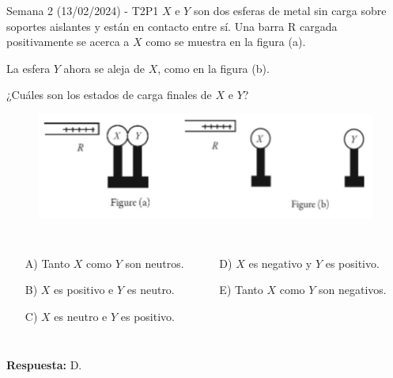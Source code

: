\begin{frame}{Semana 2 (13/02/2024) - T2P1}
        $X$ e $Y$ son dos esferas de metal sin carga sobre soportes aislantes y están en contacto entre sí. Una barra R cargada positivamente se acerca a $X$ como se muestra en la figura (a).
        
        La esfera $Y$ ahora se aleja de $X$, como en la figura (b).
        
        ¿Cuáles son los estados de carga finales de $X$ e $Y$?
        
        \begin{figure}
            \centering
            \includegraphics[scale=0.3]{figures/t2p1.png}
        \end{figure}
        
        \begin{columns}
        \begin{itemize}
            \item[A)] Tanto $X$ como $Y$ son neutros.
            \item[B)] $X$ es positivo e $Y$ es neutro.
            \item[C)] $X$ es neutro e $Y$ es positivo.
            \end{itemize}
        \begin{itemize}
            \item[D)] $X$ es negativo y $Y$ es positivo.
            \item[E)] Tanto $X$ como $Y$ son negativos.
        \end{itemize}
        \end{columns}
        
        
        
        \pause\bigskip\centering \textbf{Respuesta:} D.
\end{frame}

